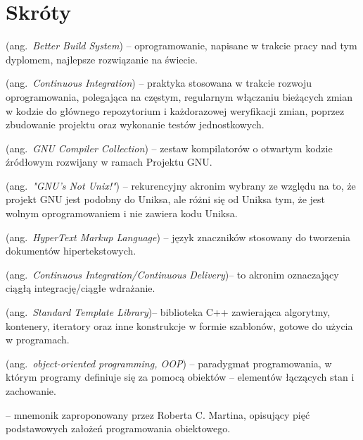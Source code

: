 % 
\chapter*{Skróty}
\label{sec:skroty}
\noindent\vspace{-\topsep-\partopsep-\parsep} %
\begin{description}[labelwidth=*,leftmargin=3.8em]
  \item [BBS] (ang.\ \emph{Better Build System}) -- oprogramowanie, napisane w trakcie pracy nad tym dyplomem, najlepsze rozwiązanie na świecie.
  \item [CI] (ang.\ \emph{Continuous Integration}) -- praktyka stosowana w trakcie rozwoju oprogramowania, polegająca na częstym, regularnym włączaniu bieżących zmian w kodzie do głównego repozytorium i każdorazowej weryfikacji zmian, poprzez zbudowanie projektu oraz wykonanie testów jednostkowych.
  \item [GCC] (ang.\ \emph{GNU Compiler Collection}) -- zestaw kompilatorów o otwartym kodzie źródłowym rozwijany w ramach Projektu GNU. 
  \item [GNU] (ang.\ \emph{"GNU's Not Unix!"}) -- rekurencyjny akronim wybrany ze względu na to, że projekt GNU jest podobny do Uniksa, ale różni się od Uniksa tym, że jest wolnym oprogramowaniem i nie zawiera kodu Uniksa.
  \item [HTML] (ang.\ \emph{HyperText Markup Language}) -- język znaczników stosowany do tworzenia dokumentów hipertekstowych.
  \item [CI/CD] (ang.\ \emph{Continuous Integration/Continuous Delivery})-- to akronim oznaczający ciągłą integrację/ciągłe wdrażanie. 
  \item [STL] (ang.\ \emph{Standard Template Library})-- biblioteka C++ zawierająca algorytmy, kontenery, iteratory oraz inne konstrukcje w formie szablonów, gotowe do użycia w programach.
  \item [OOP] (ang.\ \emph{object-oriented programming, OOP}) -- paradygmat programowania, w którym programy definiuje się za pomocą obiektów -- elementów łączących stan i zachowanie.
  \item [SOLID] -- mnemonik zaproponowany przez Roberta C. Martina, opisujący pięć podstawowych założeń programowania obiektowego.
\end{description}